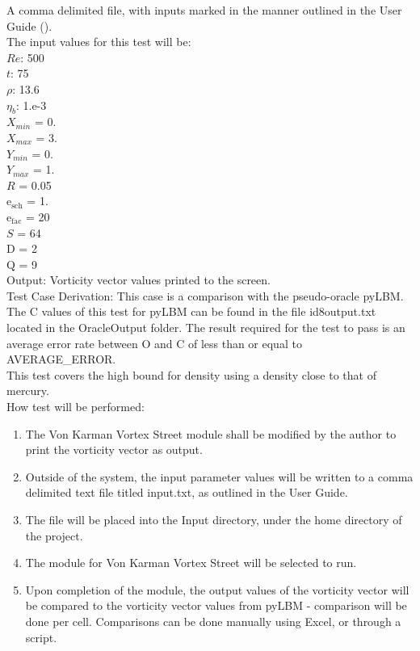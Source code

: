 \documentclass[12pt, titlepage]{article}
\begin{document}
\begin{enumerate}
A comma delimited file, with inputs marked in the manner outlined in the User
Guide (\citet{LBM_UserGuide_PM}).\\The input values for this test will be:\\
$Re$: 500\\
$t$: 75\\
$\rho$: 13.6\\
$\eta_b$: 1.e-3\\
$X_{min}$ = 0.\\
$X_{max}$ = 3.\\
$Y_{min}$ = 0.\\
$Y_{max}$ = 1.\\
$R$ = 0.05\\
$\mathrm{e_{sch}}$ = 1.\\
$\mathrm{e_{fac}}$ = 20\\
$S$ = 64\\
$\mathrm{D}$ = 2\\
$\mathrm{Q}$ = 9\\

Output: Vorticity vector values printed to the screen. \\

Test Case Derivation: This case is a comparison with the pseudo-oracle
pyLBM. The C values of this test for pyLBM can be found in the file
id8output.txt located in the OracleOutput folder. The result required for the
test to pass is an average error rate between O and C of less than or equal to
AVERAGE\_ERROR.\\

This test covers the high bound for density using a density close to that of mercury.\\
					
How test will be performed: 

\begin{enumerate}
\item The Von Karman Vortex Street module shall be modified by the author to
  print the vorticity vector as output.
\item Outside of the system, the input parameter values will be written to a
  comma delimited text file titled input.txt, as outlined in the User Guide.
\item The file will be placed into the Input directory, under the home directory of the project.
\item The module for Von Karman Vortex Street will be selected to run.
\item Upon completion of the module, the output values of the vorticity vector
  will be compared to the vorticity vector values from pyLBM - comparison will
  be done per cell. Comparisons can be done manually using Excel, or through a
  script.
\end{enumerate}


\end{enumerate}
\end{document}
